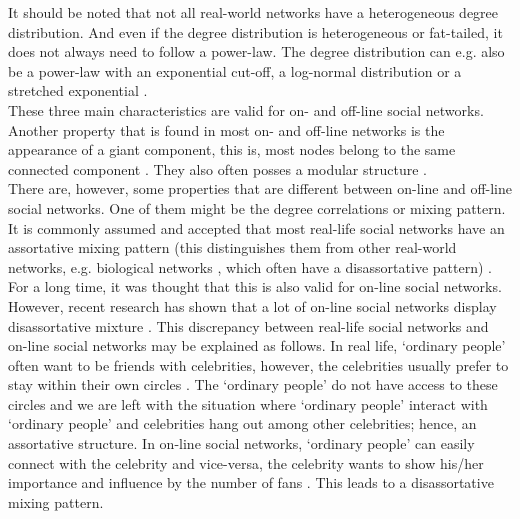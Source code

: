 \documentclass[11 pt , letterpaper , twoside , openright]{book}
\begin{document}
\newline
It should be noted that not all real-world networks have a heterogeneous degree distribution. And even if the degree distribution is heterogeneous or fat-tailed, it does not always need to follow a power-law. The degree distribution can e.g. also be a power-law with an exponential cut-off, a log-normal distribution or a stretched exponential \cite{Newman2005}.\\
\newline
These three main characteristics are valid for on- and off-line social networks. Another property that is found in most on- and off-line networks is the appearance of a giant component, this is, most nodes belong to the same connected component \cite{Latapy}. They also often posses a modular structure \cite{Ferrara2012}\cite{McGlohon2011}. \\
\newline
There are, however, some properties that are different between on-line and off-line social networks. One of them might be the degree correlations or mixing pattern. It is commonly assumed and accepted that most real-life social networks have an assortative mixing pattern (this distinguishes them from other real-world networks, e.g. biological networks \cite{F.Costa2007}, which often have a disassortative pattern) \cite{Hu2009}\cite{Zhang2014}. For a long time, it was thought that this is also valid for on-line social networks. However, recent research has shown that a lot of on-line social networks display disassortative mixture \cite{Hu2009}\cite{Zhang2014}. This discrepancy between real-life social networks and on-line social networks may be explained as follows. In real life, `ordinary people' often want to be friends with celebrities, however, the celebrities usually prefer to stay within their own circles \cite{Hu2009}\cite{Zhang2014}. The `ordinary people' do not have access to these circles and we are left with the situation where `ordinary people' interact with `ordinary people' and celebrities hang out among other celebrities; hence, an assortative structure. In on-line social networks, `ordinary people' can easily connect with the celebrity and vice-versa, the celebrity wants to show his/her importance and influence by the number of fans \cite{Hu2009}\cite{Zhang2014}. This leads to a disassortative mixing pattern.
\end{document}
